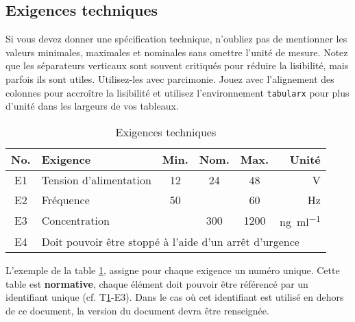 \subsection{Exigences techniques}

Si vous devez donner une spécification technique, n'oubliez pas de mentionner les valeurs minimales, maximales et nominales sans omettre l'unité de mesure. Notez que les séparateurs verticaux sont souvent critiqués pour réduire la lisibilité, mais parfois ils sont utiles. Utilisez-les avec parcimonie. Jouez avec l'alignement des colonnes pour accroître la lisibilité et utilisez l'environnement \texttt{tabularx} pour plus d'unité dans les largeurs de vos tableaux.

\begin{table}[ht]
    \begin{center}
        \caption{Exigences techniques \label{specification}}
        \begin{tabularx}{\textwidth}{cXcccr}
            \toprule
            No. & Exigence                                                                   & Min. & Nom. & Max. & Unité                           \\
            \midrule
            E1  & Tension d'alimentation                                                     & 12   & 24   & 48   & \si{\volt}                      \\
            E2  & Fréquence                                                                  & 50   &      & 60   & \si{\hertz}                     \\
            E3  & Concentration                                                              &      & 300  & 1200 & \si{\nano\gram\per\milli\litre} \\
            E4  & \multicolumn{5}{l}{Doit pouvoir être stoppé à l'aide d'un arrêt d'urgence}                                                        \\
            \bottomrule
        \end{tabularx}
    \end{center}
\end{table}

L'exemple de la table \ref{specification}, assigne pour chaque exigence un numéro unique. Cette table est \textbf{normative}, chaque élément doit pouvoir être référencé par un identifiant unique (cf. T\ref{specification}-E3). Dans le cas où cet identifiant est utilisé en dehors de ce document, la version du document devra être renseignée.

